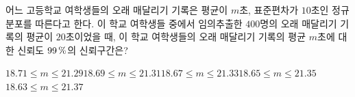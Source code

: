 어느 고등학교 여학생들의 오래 매달리기 기록은 평균이 $m$초, 표준편차가 $10$초인 정규분포를 따른다고 한다. 이 학교 여학생들 중에서 임의추출한 $400$명의 오래 매달리기 기록의 평균이 $20$초이었을 때, 이 학교 여학생들의 오래 매달리기 기록의 평균 $m$초에 대한 신뢰도 $99\mkern3mu \%$의 신뢰구간은? 
\begin{choicesii}{$18.71\le m\le 21.29$}{$18.69\le m\le 21.31$}{$18.67\le m\le 21.33$}{$18.65\le m\le 21.35$}{$18.63\le m\le 21.37$}\end{choicesii}
